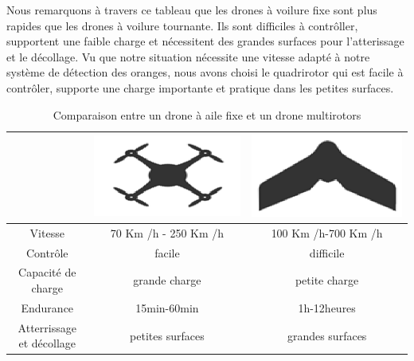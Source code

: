 Nous remarquons à travers ce tableau que les drones à voilure fixe sont plus rapides que les drones à voilure tournante. Ils sont difficiles à contrôller, supportent une faible charge et nécessitent des grandes surfaces pour l'atterissage et le décollage.
Vu que notre situation nécessite une vitesse adapté à notre système de détection des oranges, nous avons choisi le quadrirotor qui est facile à contrôler, supporte une charge importante et pratique dans les petites surfaces.      
\begin{table}[H]
\begin{center}
	\vspace{0.5cm}\caption{Comparaison entre un drone à aile fixe  et un drone multirotors }
	\begin{tabular}{|c|c|c|}
		\hline
		\centering
		& 
		\includegraphics[scale=0.2]{Images/Quadrirotor}
		&
		\includegraphics[scale=0.2]{Images/Ailed fixed}\\
		
		\hline
		Vitesse & 70 Km /h - 250 Km /h & 100 Km /h-700 Km /h  \\
		\hline
		Contrôle	& facile &	difficile \\
		\hline
		Capacité de charge &	grande charge &	petite charge \\
		\hline
		Endurance &	15min-60min & 1h-12heures \\
		\hline
		Atterrissage et décollage &	petites surfaces &	grandes surfaces \\
		\hline
	\end{tabular}
\end{center}
\end{table}	

